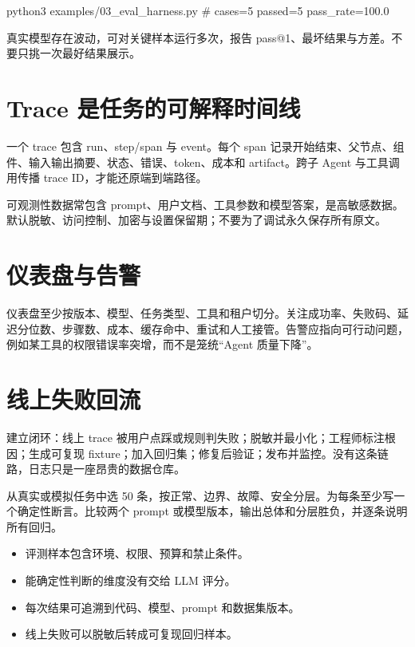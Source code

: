 \begin{codeblock}
python3 examples/03_eval_harness.py
# cases=5 passed=5 pass_rate=100.0%
\end{codeblock}

真实模型存在波动，可对关键样本运行多次，报告 pass@1、最坏结果与方差。不要只挑一次最好结果展示。

\section{Trace 是任务的可解释时间线}

一个 trace 包含 run、step/span 与 event。每个 span 记录开始结束、父节点、组件、输入输出摘要、状态、错误、token、成本和 artifact。跨子 Agent 与工具调用传播 trace ID，才能还原端到端路径。

\begin{warningbox}
可观测性数据常包含 prompt、用户文档、工具参数和模型答案，是高敏感数据。默认脱敏、访问控制、加密与设置保留期；不要为了调试永久保存所有原文。
\end{warningbox}

\section{仪表盘与告警}

仪表盘至少按版本、模型、任务类型、工具和租户切分。关注成功率、失败码、延迟分位数、步骤数、成本、缓存命中、重试和人工接管。告警应指向可行动问题，例如某工具的权限错误率突增，而不是笼统“Agent 质量下降”。

\section{线上失败回流}

建立闭环：线上 trace 被用户点踩或规则判失败；脱敏并最小化；工程师标注根因；生成可复现 fixture；加入回归集；修复后验证；发布并监控。没有这条链路，日志只是一座昂贵的数据仓库。

\begin{practice}[建立 50 条黄金集]
从真实或模拟任务中选 50 条，按正常、边界、故障、安全分层。为每条至少写一个确定性断言。比较两个 prompt 或模型版本，输出总体和分层胜负，并逐条说明所有回归。
\end{practice}

\begin{checkpoint}
\begin{itemize}
  \item \checkbox 评测样本包含环境、权限、预算和禁止条件。
  \item \checkbox 能确定性判断的维度没有交给 LLM 评分。
  \item \checkbox 每次结果可追溯到代码、模型、prompt 和数据集版本。
  \item \checkbox 线上失败可以脱敏后转成可复现回归样本。
\end{itemize}
\end{checkpoint}

